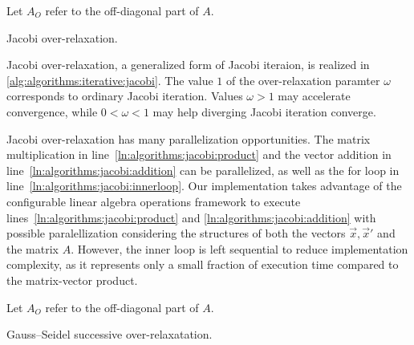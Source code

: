 \begin{algorithm}
  \;
  Let $A_O$ refer to the off-diagonal part of $A$.\;
  \;
  \caption{Jacobi over-relaxation.}
  \label{alg:algorithms:iterative:jacobi}
\end{algorithm}

Jacobi over-relaxation, a generalized form of Jacobi iteraion, is
realized in \vref{alg:algorithms:iterative:jacobi}. The value $1$ of
the over-relaxation paramter $\omega$ corresponds to ordinary Jacobi
iteration. Values $\omega > 1$ may accelerate convergence, while
$0 < \omega < 1$ may help diverging Jacobi iteration converge.

Jacobi over-relaxation has many parallelization opportunities. The
matrix multiplication in line~\ref{ln:algorithms:jacobi:product} and
the vector addition in line~\ref{ln:algorithms:jacobi:addition} can be
parallelized, as well as the for loop in
line~\ref{ln:algorithms:jacobi:innerloop}. Our implementation takes
advantage of the configurable linear algebra operations framework to
execute lines~\ref{ln:algorithms:jacobi:product} and
\ref{ln:algorithms:jacobi:addition} with possible paralellization
considering the structures of both the vectors $\vec{x}, \vec{x}'$ and
the matrix $A$. However, the inner loop is left sequential to reduce
implementation complexity, as it represents only a small fraction of
execution time compared to the matrix-vector product.

\begin{algorithm}
  \;
  Let $A_O$ refer to the off-diagonal part of $A$.\;
  \;
  \caption{Gauss--Seidel successive over-relaxatation.}
  \label{alg:algorithms:iterative:gs}
\end{algorithm}

